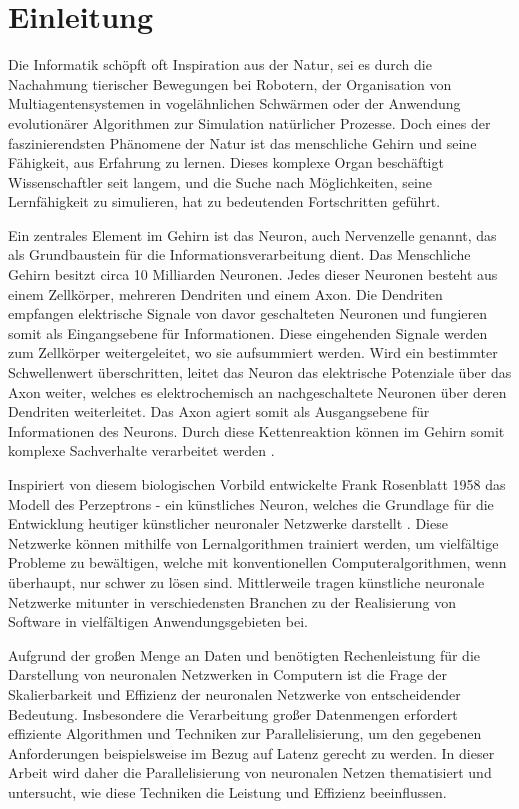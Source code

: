 \chapter{Einleitung}
\label{ch:Einleitung}

Die Informatik schöpft oft Inspiration aus der Natur, sei es durch die Nachahmung tierischer Bewegungen bei Robotern, der Organisation von Multiagentensystemen in vogelähnlichen Schwärmen oder der Anwendung evolutionärer Algorithmen zur Simulation natürlicher Prozesse. Doch eines der faszinierendsten Phänomene der Natur ist das menschliche Gehirn und seine Fähigkeit, aus Erfahrung zu lernen. Dieses komplexe Organ beschäftigt Wissenschaftler seit langem, und die Suche nach Möglichkeiten, seine Lernfähigkeit zu simulieren, hat zu bedeutenden Fortschritten geführt.

Ein zentrales Element im Gehirn ist das Neuron, auch Nervenzelle genannt, das als Grundbaustein für die Informationsverarbeitung dient. Das Menschliche Gehirn besitzt circa 10 Milliarden Neuronen. Jedes dieser Neuronen besteht aus einem Zellkörper, mehreren Dendriten und einem Axon. Die Dendriten empfangen elektrische Signale von davor geschalteten Neuronen und fungieren somit als Eingangsebene für Informationen. Diese eingehenden Signale werden zum Zellkörper weitergeleitet, wo sie aufsummiert werden. Wird ein bestimmter Schwellenwert überschritten, leitet das Neuron das elektrische Potenziale über das Axon weiter, welches es elektrochemisch an nachgeschaltete Neuronen über deren Dendriten weiterleitet. Das Axon agiert somit als Ausgangsebene für Informationen des Neurons. 
Durch diese Kettenreaktion können im Gehirn somit komplexe Sachverhalte verarbeitet werden \citep{Praktische_Einfuhrung_in_neuronale_Netze}.

Inspiriert von diesem biologischen Vorbild entwickelte Frank Rosenblatt 1958 das Modell des Perzeptrons - ein künstliches Neuron, welches die Grundlage für die Entwicklung heutiger künstlicher neuronaler Netzwerke darstellt \citep{Rosenblatt_Perceptron}. Diese Netzwerke können mithilfe von Lernalgorithmen trainiert werden, um vielfältige Probleme zu bewältigen, welche mit konventionellen Computeralgorithmen, wenn überhaupt, nur schwer zu lösen sind. Mittlerweile tragen künstliche neuronale Netzwerke mitunter in verschiedensten Branchen zu der Realisierung von Software in vielfältigen Anwendungsgebieten bei.

Aufgrund der großen Menge an Daten und benötigten Rechenleistung für die Darstellung von neuronalen Netzwerken in Computern ist die Frage der Skalierbarkeit und Effizienz der neuronalen Netzwerke von entscheidender Bedeutung. Insbesondere die Verarbeitung großer Datenmengen erfordert effiziente Algorithmen und Techniken zur Parallelisierung, um den gegebenen Anforderungen beispielsweise im Bezug auf Latenz gerecht zu werden. In dieser Arbeit wird daher die Parallelisierung von neuronalen Netzen thematisiert und untersucht, wie diese Techniken die Leistung und Effizienz beeinflussen.


